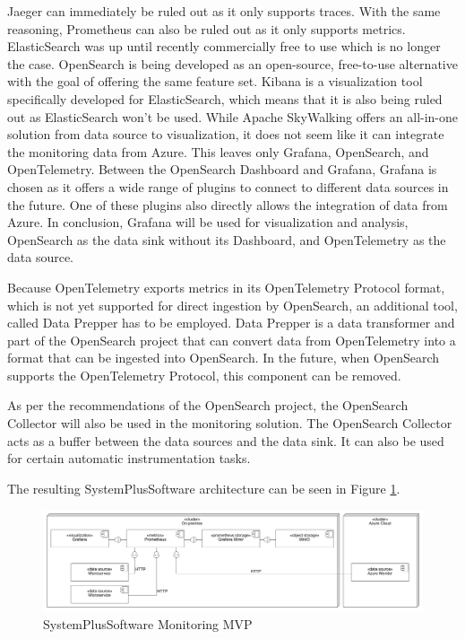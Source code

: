 Jaeger can immediately be ruled out as it only supports traces.
With the same reasoning, Prometheus can also be ruled out as it only supports metrics.
ElasticSearch was up until recently commercially free to use which is no longer the case.
OpenSearch is being developed as an open-source, free-to-use alternative with the goal
of offering the same feature set. Kibana is a visualization tool specifically developed for
ElasticSearch, which means that it is also being ruled out as ElasticSearch won't be used.
While Apache SkyWalking offers an all-in-one solution from data source to visualization,
it does not seem like it can integrate the monitoring data from Azure.
This leaves only Grafana, OpenSearch, and OpenTelemetry.
Between the OpenSearch Dashboard and Grafana, Grafana is chosen as it offers a wide range
of plugins to connect to different data sources in the future. One of these plugins also
directly allows the integration of data from Azure.
In conclusion, Grafana will be used for visualization and analysis, OpenSearch as the data sink without its Dashboard,
and OpenTelemetry as the data source.

Because OpenTelemetry exports metrics in its OpenTelemetry Protocol format,
which is not yet supported for direct ingestion by OpenSearch,
an additional tool, called Data Prepper has to be employed.
Data Prepper is a data transformer and part of the OpenSearch project that can convert
data from OpenTelemetry into a format that can be ingested into OpenSearch.
In the future, when OpenSearch supports the OpenTelemetry Protocol, this component can be removed.

As per the recommendations of the OpenSearch project, the OpenSearch Collector will also be used
in the monitoring solution. The OpenSearch Collector acts as a buffer between the data sources
and the data sink. It can also be used for certain automatic instrumentation tasks.

The resulting SystemPlusSoftware architecture can be seen in Figure \ref{fig:sps_monitoring_mvp}.

\begin{figure}[h]
	\centering
	\includegraphics[width=\textwidth]{figures/sps_monitoring_mvp.png}
	\caption{SystemPlusSoftware Monitoring MVP}
	\label{fig:sps_monitoring_mvp}
\end{figure}